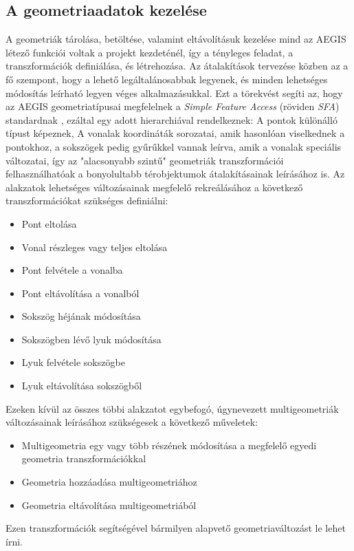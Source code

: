 \subsection{A geometriaadatok kezelése}
A geometriák tárolása, betöltése, valamint eltávolításuk kezelése mind az AEGIS létező funkciói voltak a projekt kezdeténél, így a tényleges feladat, a transzformációk definiálása, és létrehozása.
Az átalakítások tervezése közben az a fő szempont, hogy a lehető legáltalánosabbak legyenek, és minden lehetséges módosítás leírható legyen véges alkalmazásukkal. Ezt a törekvést segíti az, hogy az AEGIS geometriatípusai megfelelnek a \emph{Simple Feature Access} (röviden \emph{SFA}) standardnak \cite{sfa} , ezáltal egy adott hierarchiával rendelkeznek: A pontok különálló típust képeznek, A vonalak koordináták sorozatai, amik hasonlóan viselkednek a pontokhoz, a sokszögek pedig gyűrűkkel vannak leírva, amik a vonalak speciális változatai, így az "alacsonyabb szintű" geometriák transzformációi felhasználhatóak a bonyolultabb térobjektumok átalakításainak leírásához is. Az alakzatok lehetséges változásainak megfelelő rekreálásához a következő transzformációkat szükséges definiálni:
\begin{itemize}
	\item Pont eltolása
	\item Vonal részleges vagy teljes eltolása
	\item Pont felvétele a vonalba
	\item Pont eltávolítása a vonalból
	\item Sokszög héjának módosítása
	\item Sokszögben lévő lyuk módosítása
	\item Lyuk felvétele sokszögbe
	\item Lyuk eltávolítása sokszögből
\end{itemize}
Ezeken kívül az összes többi alakzatot egybefogó, úgynevezett multigeometriák változásainak leírásához szükségesek a következő műveletek:
\begin{itemize}
	\item Multigeometria egy vagy több részének módosítása a megfelelő egyedi geometria transzformációkkal
	\item Geometria hozzáadása multigeometriához
	\item Geometria eltávolítása multigeometriából
\end{itemize}
Ezen transzformációk segítségével bármilyen alapvető geometriaváltozást le lehet írni.

